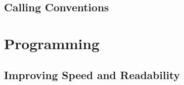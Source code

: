 \documentclass[12pt]{article}
\begin{document}
\subsection{Calling Conventions}

\section{Programming}


\subsection{Improving Speed and Readability}
\end{document}
